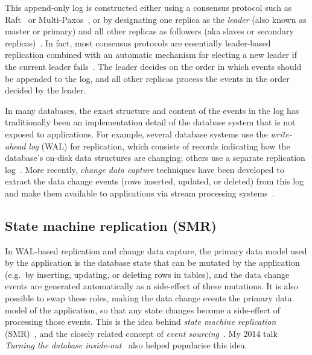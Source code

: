 \documentclass[sigconf]{acmart}
\begin{document}
This append-only log is constructed either using a consensus protocol such as Raft~\cite{Ongaro:2014} or Multi-Paxos~\cite{Lamport:2001}, or by designating one replica as the \emph{leader} (also known as master or primary) and all other replicas as followers (aka slaves or secondary replicas)~\cite{Gray:1996}.
In fact, most consensus protocols are essentially leader-based replication combined with an automatic mechanism for electing a new leader if the current leader fails~\cite{Howard:2020}.
The leader decides on the order in which events should be appended to the log, and all other replicas process the events in the order decided by the leader.

In many databases, the exact structure and content of the events in the log has traditionally been an implementation detail of the database system that is not exposed to applications.
For example, several database systems use the \emph{write-ahead log} (WAL) for replication, which consists of records indicating how the database's on-disk data structures are changing; others use a separate replication log~\cite{Hellerstein:2007}.
More recently, \emph{change data capture} techniques have been developed to extract the data change events (rows inserted, updated, or deleted) from this log and make them available to applications via stream processing systems~\cite{Das:2012,Debezium}.

\subsection{State machine replication (SMR)}\label{sec:smr}

In WAL-based replication and change data capture, the primary data model used by the application is the database state that can be mutated by the application (e.g.\ by inserting, updating, or deleting rows in tables), and the data change events are generated automatically as a side-effect of these mutations.
It is also possible to swap these roles, making the data change events the primary data model of the application, so that any state changes become a side-effect of processing those events.
This is the idea behind \emph{state machine replication} (SMR)~\cite{Schneider:1990}, and the closely related concept of \emph{event sourcing}~\cite{Fowler:2005,Zimarev:2020}.
My 2014 talk \emph{Turning the database inside-out}~\cite{InsideOut} also helped popularise this idea.
\end{document}
